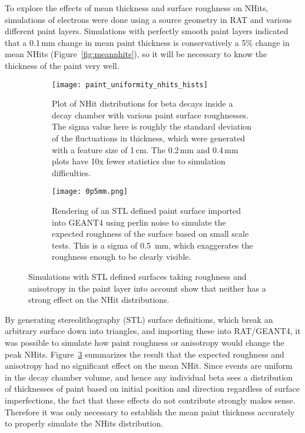 To explore the effects of mean thickness and surface roughness on NHits, simulations of \Li electrons were done using a source geometry in RAT and various different paint layers. Simulations with perfectly smooth paint layers indicated that a 0.1\,mm change in mean paint thickness is conservatively a 5\% change in mean NHits (Figure~\ref{fig:meannhits}), so it will be necessary to know the thickness of the paint very well. 

\begin{figure}[h!]
\begin{subfigure}{.53\textwidth}
  \texttt{[image: paint\_uniformity\_nhits\_hists]}
  \caption{Plot of NHit distributions for \Li beta decays inside a decay chamber with various paint surface roughnesses. The sigma value here is roughly the standard deviation of the fluctuations in thickness, which were generated with a feature size of 1\,cm. The 0.2\,mm and 0.4\,mm plots have 10x fewer statistics due to simulation difficulties.}
  \label{fig:simulations}
\end{subfigure}
\hspace{0.5cm}
\begin{subfigure}{.38\textwidth}
  \centering
  \texttt{[image: 0p5mm.png]}
  \caption{Rendering of an STL defined paint surface imported into GEANT4 using perlin noise to simulate the expected roughness of the surface based on small scale tests. This is a sigma of 0.5~mm, which exaggerates the roughness enough to be clearly visible.}
  \label{fig:rough_sphere}
\end{subfigure}
\caption{Simulations with STL defined surfaces taking roughness and anisotropy in the paint layer into account show that neither has a strong effect on the NHit distributions.}
\label{fig:stltests}
\end{figure}

By generating stereolithography (STL) surface definitions, which break an arbitrary surface down into triangles, and importing these into RAT/GEANT4, it was possible to simulate how paint roughness or anisotropy would change the peak NHits. 
Figure~\ref{fig:stltests} summarizes the result that the expected roughness and anisotropy had no significant effect on the mean NHit. 
Since events are uniform in the decay chamber volume, and hence any individual beta sees a distribution of thicknesses of paint based on initial position and direction regardless of surface imperfections, the fact that these effects do not contribute strongly makes sense. 
Therefore it was only necessary to establish the mean paint thickness accurately to properly simulate the NHits distribution.

